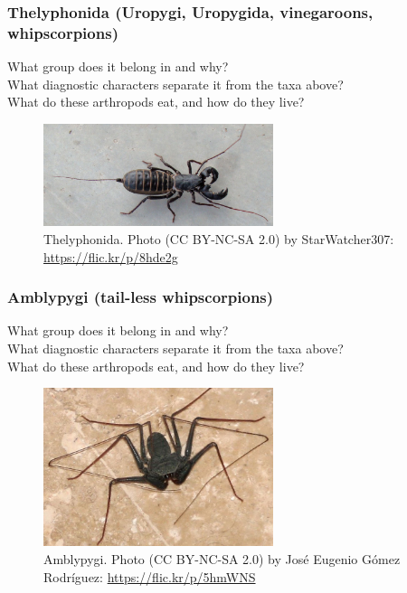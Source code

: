 \documentclass[letterpaper, 11pt]{article}
\begin{document}
\subsubsection*{Thelyphonida (Uropygi, Uropygida, vinegaroons, whipscorpions)}
What group does it belong in and why?\\

\noindent{}What diagnostic characters separate it from the taxa above?\\

\noindent{}What do these arthropods eat, and how do they live?\\

\begin{figure}[ht!]
  \centering
    \includegraphics[width=0.6\textwidth]{thelyphonida}
  \caption{Thelyphonida. Photo (CC BY-NC-SA 2.0) by StarWatcher307: \url{https://flic.kr/p/8hde2g}}
  \label{fig:thelyphonida}
\end{figure}

\subsubsection*{Amblypygi (tail-less whipscorpions)}
What group does it belong in and why?\\

\noindent{}What diagnostic characters separate it from the taxa above?\\

\noindent{}What do these arthropods eat, and how do they live?\\

\begin{figure}[ht!]
  \centering
    \includegraphics[width=0.6\textwidth]{ambly1}
  \caption{Amblypygi. Photo (CC BY-NC-SA 2.0) by Jos\'{e} Eugenio G\'{o}mez Rodr\'{i}guez: \url{https://flic.kr/p/5hmWNS} }
  \label{fig:ambly1}
\end{figure}
\end{document}
